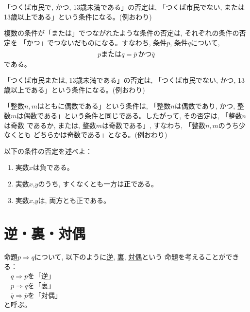 \begin{exmpl} 「つくば市民で, かつ, 13歳未満である」の否定は, 
「つくば市民でない, または13歳以上である」という条件になる。(例おわり)\end{exmpl}

複数の条件が「または」でつながれたような条件の否定は, それぞれの条件の否定を
「かつ」でつないだものになる。すなわち, 条件$p$, 条件$q$について, 
\begin{eqnarray}
\overline{p\text{または}q}=\overline{p}\,\text{かつ}\overline{q}
\end{eqnarray}
である。

\begin{exmpl} 「つくば市民または, 13歳未満である」の否定は, 
「つくば市民でない, かつ, 13歳以上である」という条件になる。(例おわり)\end{exmpl}

\begin{exmpl} 「整数$n, m$はともに偶数である」という条件は, 「整数$n$は偶数であり, かつ, 
整数$m$は偶数である」という条件と同じである。したがって, その否定は, 「整数$n$は奇数
であるか, または, 整数$m$は奇数である」, すなわち, 「整数$n, m$のうち少なくとも
どちらかは奇数である」となる。(例おわり)\end{exmpl}

\begin{q}\label{q:cond0} 以下の条件の否定を述べよ：
\begin{enumerate}
\item 実数$x$は負である。
\item 実数$x$,$y$のうち, すくなくとも一方は正である。
\item 実数$x$,$y$は, 両方とも正である。
\end{enumerate}
\end{q}
\vv


\section{逆・裏・対偶}

命題$p \Longrightarrow q$について, 以下のように\underline{逆}, \underline{裏}, \underline{対偶}という
命題を考えることができる：\\
　$q \Longrightarrow p$を「逆」\\
　$\overline{p} \Longrightarrow \overline{q}$を「裏」\\
　$\overline{q} \Longrightarrow \overline{p}$を「対偶」\\
と呼ぶ。

